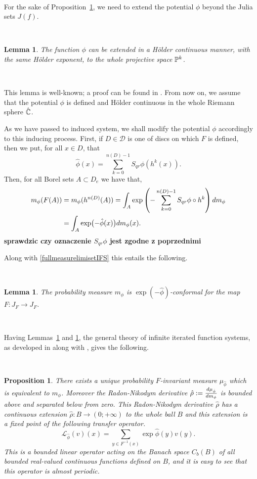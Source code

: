 \documentclass[12pt]{amsart}
\numberwithin{equation}{section}
\newcommand{\nl}{\newline}
\newtheorem{prop}[thm]{Proposition}
\newtheorem{lem}[thm]{Lemma}
\def\({\bigl(}                \def\){\bigr)}
\def\lt{\left}                \def\rt{\right}
\def\sp{\medskip}             \def\fr{\noindent}        \def\nl{\newline}
\begin{document}
\

\fr For the sake of Proposition~\ref{muphiFinvariant}, we need to extend the
potential $\phi$ beyond the Julia sets $J(f)$. 

\

\begin{lem}\label{holderextension}
The function $\phi$ can be extended in a H\"older continuous manner,
with the same H\"older exponent, to the whole projective space ${\mathbb P}^k$.  
\end{lem}

\

\fr This lemma is well-known; a proof can be found in \cite{uzpk}.
From now on, we assume that the potential $\phi$ is defined and
H\"older continuous in the whole Riemann sphere $\hat {{\mathbb C}}$. 

\sp\fr As we have passed to induced system, we shall modify the potential
$\phi$ accordingly to this inducing process. 
First, if $D\in\mathcal{D}$ is one of discs on which $F$ is defined,
then we put, for all $x\in D$, that
$$
\hat\phi(x)=\sum_{k=0}^{n(D)-1}S_{qr}\phi(h^k(x)).
$$
Then, for all Borel sets $A\subset D_e$ we have that,
$$
\aligned
m_\phi(F(A))
&=m_\phi(h^{n(D)}(A))
=\int_A\exp\lt(-\sum_{k=0}^{n(D)-1}S_{qr}\phi\circ h^k\rt)dm_\phi \\
&=\int_A\exp\(-\hat\phi(x)\)dm_\phi(x).
\endaligned
$$
{\bf sprawdzic czy oznaczenie $S_{qr}\phi$ jest zgodne z poprzednimi}

Along with \eqref{fullmeasurelimisetIFS} this entails the following.

\

\begin{lem}\label{mphiFconformality}
The probability measure $m_\phi$ is $\exp(-\hat\phi)$-conformal for the
map $F:J_F\to J_F$. 
\end{lem}

\

\fr Having Lemmas~\ref{mphiFconformality} and \ref{holderextension}, the
general theory of infinite iterated function systems, as developed 
in \cite{mu} along with \cite{MU}, gives the following.

\

\begin{prop}\label{muphiFinvariant}
There exists a unique probability $F$-invariant measure
$\mu_{\hat\phi}$ which is equivalent to $m_\phi$. Moreover the
Radon-Nikodym derivative $\hat\rho:={{d\mu_{\hat\phi}}\over{d m_\phi}}$
is bounded above and separated below from zero. This Radon-Nikodym
derivative $\hat\rho$ has a continuous extension $\hat\rho:B\to
(0;+\infty)$ to the whole ball $B$ and this extension is a fixed point
of the following transfer operator.
$$
\mathcal{L}_{\hat\phi}(v)(x)
=\sum_{y\in  F^{-1}(x)}\exp\hat\phi(y)v(y).
$$
This is a bounded linear operator acting on the Banach space $C_b(B)$
of all bounded real-valued continuous functions defined on $B$, and it is easy
to see that this operator is almost periodic. 
\end{prop}
\end{document}
